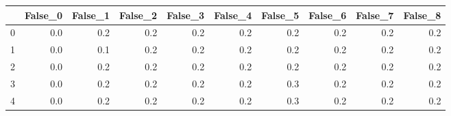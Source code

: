 \begin{tabular}{lrrrrrrrrr}
\toprule
{} &  False\_0 &  False\_1 &  False\_2 &  False\_3 &  False\_4 &  False\_5 &  False\_6 &  False\_7 &  False\_8 \\ \hline
\midrule
0 &      0.0 &      0.2 &      0.2 &      0.2 &      0.2 &      0.2 &      0.2 &      0.2 &      0.2 \\ \hline
1 &      0.0 &      0.1 &      0.2 &      0.2 &      0.2 &      0.2 &      0.2 &      0.2 &      0.2 \\ \hline
2 &      0.0 &      0.2 &      0.2 &      0.2 &      0.2 &      0.2 &      0.2 &      0.2 &      0.2 \\ \hline
3 &      0.0 &      0.2 &      0.2 &      0.2 &      0.2 &      0.3 &      0.2 &      0.2 &      0.2 \\ \hline
4 &      0.0 &      0.2 &      0.2 &      0.2 &      0.2 &      0.3 &      0.2 &      0.2 &      0.2 \\ \hline
\bottomrule
\end{tabular}
